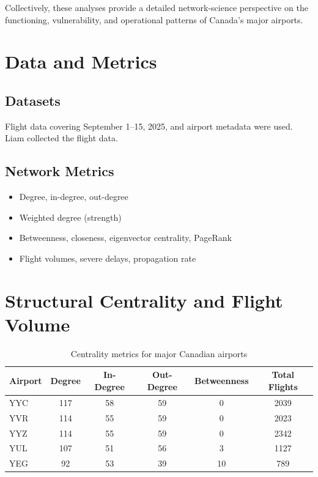 \documentclass{svproc}
\begin{document}
Collectively, these analyses provide a detailed network-science perspective on the functioning, vulnerability, and operational patterns of Canada’s major airports.

\section{Data and Metrics}
\subsection{Datasets}
Flight data covering September 1–15, 2025, and airport metadata were used. Liam collected the flight data.  

\subsection{Network Metrics}
\begin{itemize}
    \item Degree, in-degree, out-degree
    \item Weighted degree (strength)
    \item Betweenness, closeness, eigenvector centrality, PageRank
    \item Flight volumes, severe delays, propagation rate
\end{itemize}

\section{Structural Centrality and Flight Volume}
\begin{table}[h!]
\caption{Centrality metrics for major Canadian airports}
\centering
\begin{tabular}{lccccc}
\toprule
Airport & Degree & In-Degree & Out-Degree & Betweenness & Total Flights \\
\midrule
YYC & 117 & 58 & 59 & 0 & 2039 \\
YVR & 114 & 55 & 59 & 0 & 2023 \\
YYZ & 114 & 55 & 59 & 0 & 2342 \\
YUL & 107 & 51 & 56 & 3 & 1127 \\
YEG & 92  & 53 & 39 & 10 & 789 \\
\bottomrule
\end{tabular}
\end{table}
\end{document}
